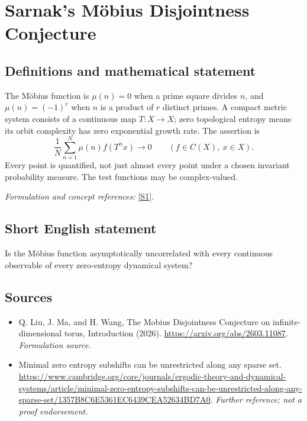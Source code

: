 \documentclass[11pt]{article}
\begin{document}
\section*{\texorpdfstring{Sarnak's Möbius Disjointness Conjecture}{Sarnak's Möbius Disjointness Conjecture}}\label{30002209}
\subsection{Definitions and mathematical statement}
The Möbius function is $\mu(n)=0$ when a prime square divides $n$, and $\mu(n)=(-1)^r$ when $n$ is a product of $r$ distinct primes. A compact metric system consists of a continuous map $T:X\to X$; zero topological entropy means its orbit complexity has zero exponential growth rate. The assertion is
\[
 \frac1N\sum_{n=1}^{N}\mu(n)f(T^nx)\longrightarrow0
 \qquad(f\in C(X),\ x\in X).
\]
Every point is quantified, not just almost every point under a chosen invariant probability measure. The test functions may be complex-valued.
\par\smallskip\textit{Formulation and concept references:} \href{https://arxiv.org/abs/2603.11087}{[S1]}.

\subsection{Short English statement}
Is the Möbius function asymptotically uncorrelated with every continuous observable of every zero-entropy dynamical system?
\subsection{Sources}
\begin{itemize}
\item[S1]Q. Liu, J. Ma, and H. Wang, The Mobius Disjointness Conjecture on infinite-dimensional torus, Introduction (2026).
\url{https://arxiv.org/abs/2603.11087}.
\textit{Formulation source.}
\item[S2]Minimal zero entropy subshifts can be unrestricted along any sparse set.
\url{https://www.cambridge.org/core/journals/ergodic-theory-and-dynamical-systems/article/minimal-zero-entropy-subshifts-can-be-unrestricted-along-any-sparse-set/1357B8C6E5361EC6439CEA52634BD7A0}.
\textit{Further reference; not a proof endorsement.}
\end{itemize}
\end{document}

